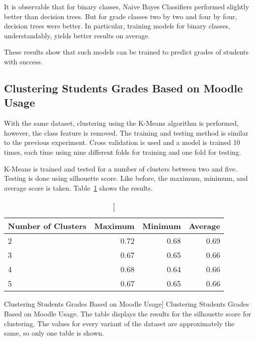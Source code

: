 It is observable that for binary classes, Naive Bayes Classifiers performed
slightly better than decision trees. But for grade classes two by two and four
by four, decision trees were better. In particular, training models for binary
classes, understandably, yields better results on average.

These results show that such models can be trained to predict grades of
students with success.

\subsection{Clustering Students Grades Based on Moodle Usage}
\label{sec:exp_002}

With the same dataset, clustering using the K-Means algorithm is performed,
however, the class feature is removed. The training and testing method is
similar to the previous experiment. Cross validation is used and a model is
trained 10 times, each time using nine different folds for training and one
fold for testing.

K-Means is trained and tested for a number of clusters between two and five.
Testing is done using silhouette score. Like before, the maximum, minimum, and
average score is taken. Table~\ref{tab:exp_002_res} shows the results.

\begin{table}[h!]
    \centering

    \begin{tabular}{| l | r | r | r |}
        \hline
        \textbf{Number of Clusters} & \textbf{Maximum} & \textbf{Minimum} & \textbf{Average} \\ \hline
        2 & 0.72 & 0.68 & 0.69 \\ \hline
        3 & 0.67 & 0.65 & 0.66 \\ \hline
        4 & 0.68 & 0.64 & 0.66 \\ \hline
        5 & 0.67 & 0.65 & 0.66 \\ \hline
    \end{tabular}

    \caption
        [Clustering Students Grades Based on Moodle Usage]
        {Clustering Students Grades Based on Moodle Usage. The table displays
        the results for the silhouette score for clustering. The values for
        every variant of the dataset are approximately the same, so only one
        table is shown.}

    \label{tab:exp_002_res}
\end{table}

